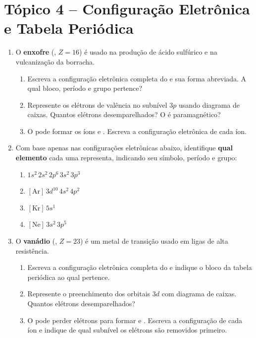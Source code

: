 \documentclass[10pt,a4paper]{article}
\begin{document}
\newpage
\section*{Tópico 4 \; -- \; Configuração Eletrônica e Tabela Periódica}

\begin{enumerate}[resume]

\item O \textbf{enxofre} (, $Z=16$) é usado na produção
  de ácido sulfúrico e na vulcanização da borracha.
  \begin{enumerate}
    \item Escreva a configuração eletrônica completa do 
          e sua forma abreviada. A qual bloco, período e grupo
          pertence?
    \item Represente os elétrons de valência no subnível $3p$
          usando diagrama de caixas. Quantos elétrons
          desemparelhados? O  é paramagnético?
    \item O  pode formar os íons  e .
          Escreva a configuração eletrônica de cada íon.
  \end{enumerate}

\item Com base apenas nas configurações eletrônicas abaixo,
  identifique \textbf{qual elemento} cada uma representa,
  indicando seu símbolo, período e grupo:
  \begin{enumerate}
    \item $1s^2\,2s^2\,2p^6\,3s^2\,3p^3$
    \item $[\text{Ar}]\,3d^{10}\,4s^2\,4p^2$
    \item $[\text{Kr}]\,5s^1$
    \item $[\text{Ne}]\,3s^2\,3p^5$
  \end{enumerate}

\item O \textbf{vanádio} (, $Z = 23$) é um metal de
  transição usado em ligas de alta resistência.
  \begin{enumerate}
    \item Escreva a configuração eletrônica completa do 
          e indique o bloco da tabela periódica ao qual pertence.
    \item Represente o preenchimento dos orbitais $3d$ com
          diagrama de caixas. Quantos elétrons desemparelhados?
    \item O  pode perder elétrons para formar 
          e . Escreva a configuração de cada íon
          e indique de qual subnível os elétrons são removidos
          primeiro.
  \end{enumerate}


\end{enumerate}
\end{document}
